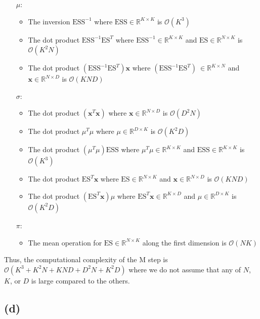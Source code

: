 \documentclass[12pt]{article}
\begin{document}
\begin{itemize}
\item [$\mu$:]\begin{itemize}
\item The inversion $\text{ESS}^{-1}$ where $\text{ESS} \in \mathbb{R}^{K \times K}$ is $\mathcal{O}(K^3)$
\item The dot product $\text{ESS}^{-1} \text{ES}^T$ where $\text{ESS}^{-1} \in \mathbb{R}^{K \times K}$ and $\text{ES} \in \mathbb{R}^{N \times K}$ is  $\mathcal{O}(K^2N)$
\item The dot product $(\text{ESS}^{-1} \text{ES}^T)\textbf{x}$ where $(\text{ESS}^{-1} \text{ES}^T)\ \in \mathbb{R}^{K \times N}$ and $\textbf{x} \in \mathbb{R}^{N \times D}$ is  $\mathcal{O}(KND)$
\end{itemize}

\item [$\sigma$:] \begin{itemize}
\item The dot product $(\textbf{x}^{T} \textbf{x})$ where $\textbf{x} \in \mathbb{R}^{N \times D}$ is  $\mathcal{O}(D^2N)$
\item The dot product $\mu^{T} \mu$ where $\mu \in \mathbb{R}^{D \times K}$ is  $\mathcal{O}(K^2D)$
\item The dot product $(\mu^{T} \mu)\text{ESS}$ where $\mu^{T} \mu \in \mathbb{R}^{K \times K}$ and $\text{ESS} \in \mathbb{R}^{K \times K}$ is $\mathcal{O}(K^3)$
\item The dot product  $\text{ES}^T\textbf{x}$ where $\text{ES} \in \mathbb{R}^{N \times K}$ and $\textbf{x} \in \mathbb{R}^{N \times D}$ is  $\mathcal{O}(KND)$
\item The dot product $(\text{ES}^T\textbf{x}) \mu$ where $\text{ES}^T\textbf{x} \in \mathbb{R}^{K\times D}$ and $\mu \in \mathbb{R}^{D \times K}$ is $\mathcal{O}(K^2 D)$
\end{itemize}
\item [$\pi$:] \begin{itemize}
    \item The mean operation for $\text{ES} \in \mathbb{R}^{N \times K}$ along the first dimension is $\mathcal{O}(NK)$
    \end{itemize}
\end{itemize}

Thus, the computational complexity of the M step is $\mathcal{O}(K^3+K^2N + KND + D^2N + K^2D)$ where we do not assume that any of $N$, $K$, or $D$ is large compared to the others.
\newpage
\subsection*{(d)}
\end{document}
